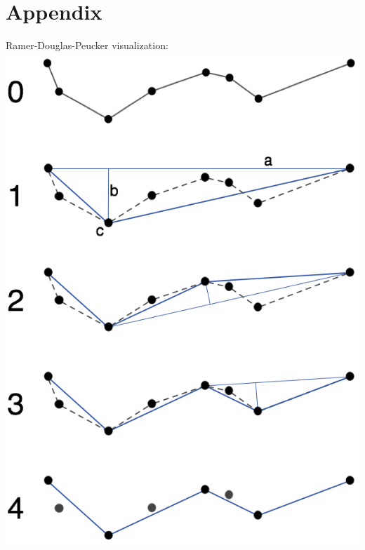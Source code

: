 \documentclass[twoside]{scrartcl}
\begin{document}
\newpage
\section{Appendix}
Ramer-Douglas-Peucker visualization:\\
\includegraphics[scale=0.6]{rdp.png}
\end{document}
